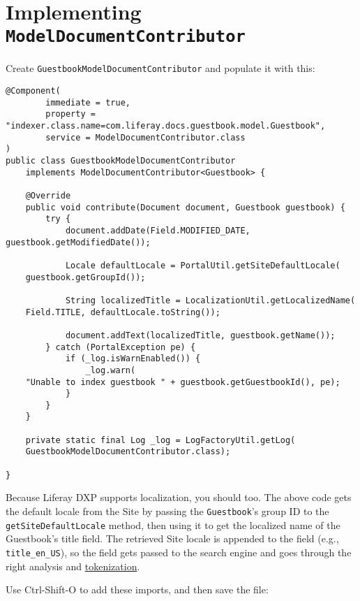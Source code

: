 \section{\texorpdfstring{Implementing
\texttt{ModelDocumentContributor}}{Implementing ModelDocumentContributor}}\label{implementing-modeldocumentcontributor}

Create \texttt{GuestbookModelDocumentContributor} and populate it with
this:

\begin{verbatim}
@Component(
        immediate = true,
        property = "indexer.class.name=com.liferay.docs.guestbook.model.Guestbook",
        service = ModelDocumentContributor.class
)
public class GuestbookModelDocumentContributor
    implements ModelDocumentContributor<Guestbook> {

    @Override
    public void contribute(Document document, Guestbook guestbook) {
        try {
            document.addDate(Field.MODIFIED_DATE, guestbook.getModifiedDate());

            Locale defaultLocale = PortalUtil.getSiteDefaultLocale(
    guestbook.getGroupId());

            String localizedTitle = LocalizationUtil.getLocalizedName(
    Field.TITLE, defaultLocale.toString());

            document.addText(localizedTitle, guestbook.getName());
        } catch (PortalException pe) {
            if (_log.isWarnEnabled()) {
                _log.warn(
    "Unable to index guestbook " + guestbook.getGuestbookId(), pe);
            }
        }
    }

    private static final Log _log = LogFactoryUtil.getLog(
    GuestbookModelDocumentContributor.class);

}
\end{verbatim}

Because Liferay DXP supports localization, you should too. The above
code gets the default locale from the Site by passing the
\texttt{Guestbook}'s group ID to the \texttt{getSiteDefaultLocale}
method, then using it to get the localized name of the Guestbook's title
field. The retrieved Site locale is appended to the field (e.g.,
\texttt{title\_en\_US}), so the field gets passed to the search engine
and goes through the right analysis and
\href{https://www.elastic.co/guide/en/elasticsearch/reference/7.x/analysis-tokenizers.html}{tokenization}.

Use Ctrl-Shift-O to add these imports, and then save the file:

